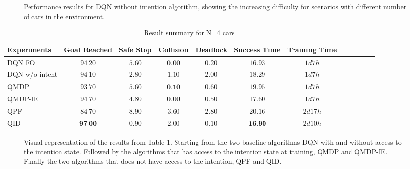 	\begin{figure}[!t]
		\centering
			\caption{Performance results for DQN without intention algorithm, showing the increasing difficulty for scenarios with different number of cars in the environment.}
		\label{fig:number_cars}
	\end{figure}
	
	
	\begin{table}
	\caption{Result summary for N=4 cars}
	\label{tab:results_summary}
	\begin{tabularx}{\columnwidth}{@{}l*{10}{c}c@{}}
	\toprule
	Experiments     & Goal Reached & Safe Stop & Collision & Deadlock & Success Time & Training Time\\ 
	\midrule
	DQN FO & $94.20$ & $5.60$ & $\textbf{0.00}$ & $0.20$ & $16.93$ & $1d7h$ \\ 
	DQN w/o intent & $94.10$ & $2.80$ & $1.10$ & $2.00$ & $18.29$ & $1d7h$ \\ 
	QMDP & $93.70$ & $5.60$ & $\textbf{0.10}$ & $0.60$ & $19.95$ & $1d7h$ \\ 
	QMDP-IE & $94.70$ & $4.80$ & $\textbf{0.00}$ & $0.50$ & $17.60$ & $1d7h$ \\  
	QPF & $84.70$ & $8.90$ & $3.60$ & $2.80$ & $20.16$ & $2d17h$ \\ 
	QID & $\textbf{97.00}$ & $0.90$ & $2.00$ & $0.10$ & $\textbf{16.90}$ & $2d10h$ \\ 
	\bottomrule
	\end{tabularx}
	\end{table}
	
	\begin{figure}[!t]
		\centering
			\caption{Visual representation of the results from Table \ref{tab:results_summary}. Starting from the two baseline algorithms DQN with and without access to the intention state. Followed by the algorithms that has access to the intention state at training, QMDP and QMDP-IE. Finally the two algorithms that does not have access to the intention, QPF and QID.}
		\label{fig:results_summary}
	\end{figure}
	

